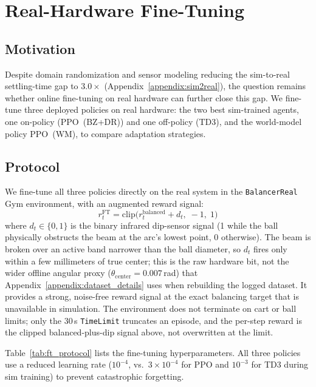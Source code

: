 \section{Real-Hardware Fine-Tuning}
\label{appendix:finetuning}

\subsection{Motivation}

Despite domain randomization and sensor modeling reducing the
sim-to-real settling-time gap to $3.0\times$
(Appendix~\ref{appendix:sim2real}), the question remains whether
online fine-tuning on real hardware can further close this gap.
We fine-tune three deployed policies on real hardware: the two best
sim-trained agents, one on-policy (PPO~(BZ+DR)) and one off-policy (TD3),
and the world-model policy PPO~(WM), to compare adaptation strategies.

\subsection{Protocol}

We fine-tune all three policies directly on the real system in the
\texttt{BalancerReal} Gym environment, with an
augmented reward signal:
\begin{equation}
  r_t^{\text{FT}} = \mathrm{clip}\bigl(r_t^{\text{balanced}} + d_t,\; -1,\; 1\bigr)
\end{equation}
where $d_t \in \{0, 1\}$ is the binary infrared dip-sensor signal
(1 while the ball physically obstructs the beam at the arc's lowest
point, 0 otherwise). The beam is broken over an active band narrower
than the ball diameter, so $d_t$ fires only within a few millimeters of
true center; this is the raw hardware bit, not the wider offline angular
proxy ($\theta_\text{center} = 0.007$\,rad) that
Appendix~\ref{appendix:dataset_details} uses when rebuilding the logged
dataset. It provides a strong, noise-free reward signal at the exact
balancing target that is unavailable in simulation.
The environment does not terminate on cart or ball limits; only the 30\,s
\texttt{TimeLimit} truncates an episode, and the per-step reward is the
clipped balanced-plus-dip signal above, not overwritten at the limit.

Table~\ref{tab:ft_protocol} lists the fine-tuning hyperparameters.
All three policies use a reduced learning rate ($10^{-4}$, vs.\ $3\times10^{-4}$
for PPO and $10^{-3}$ for TD3 during sim training) to prevent
catastrophic forgetting.

